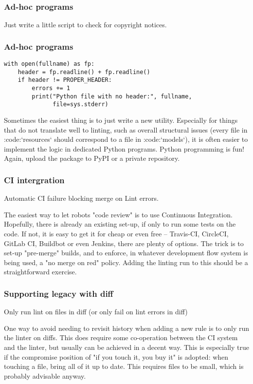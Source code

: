 \begin{frame}
\frametitle{Ad-hoc programs}
Just write a little script to check for copyright notices.
\end{frame}

\begin{frame}[fragile]
\frametitle{Ad-hoc programs}

\begin{lstlisting}
with open(fullname) as fp:
    header = fp.readline() + fp.readline()
    if header != PROPER_HEADER:
        errors += 1
        print("Python file with no header:", fullname,
              file=sys.stderr)
\end{lstlisting}
\end{frame}

Sometimes the easiest thing is to just write a new utility.
Especially for things that do not translate well to linting,
such as overall structural issues
(every file in :code:`resources` should correspond to
a file in :code:`models`),
it is often easier to implement the logic in dedicated Python programs.
Python programming is fun!
Again, upload the package to PyPI or a private repository.

\begin{frame}
\frametitle{CI intergration}
Automatic CI failure blocking merge on Lint errors.
\end{frame}

The easiest way to let robots "code review"
is to use Continuous Integration.
Hopefully,
there is already an existing set-up,
if only to run some tests on the code.
If not,
it is easy to get it for cheap or even free --
Travis-CI, CircleCI, GitLab CI, Buildbot
or even Jenkins,
there are plenty of options.
The trick is to set-up "pre-merge"
builds,
and to enforce,
in whatever development flow system is being used,
a "no merge on red"
policy.
Adding the linting run to this should be a straightforward exercise.


\begin{frame}
\frametitle{Supporting legacy with diff}
Only run lint on files in diff
(or only fail on lint errors in diff)
\end{frame}

One way to avoid needing to revisit history when adding a new rule
is to only run the linter on diffs.
This does require some co-operation between the CI system
and the linter,
but usually can be achieved in a decent way.
This is especially true if the compromise position of
"if you touch it, you buy it"
is adopted:
when touching a file,
bring all of it up to date.
This requires files to be small,
which is probably advisable anyway.

